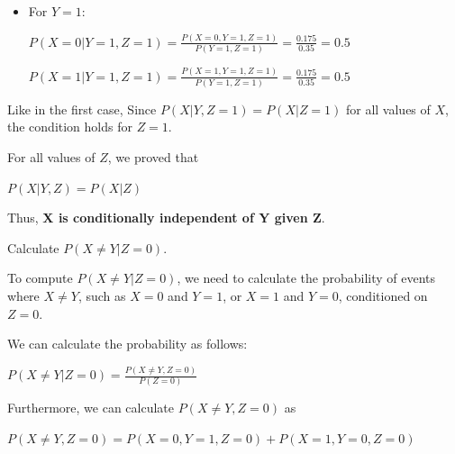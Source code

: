 \documentclass[12pt,letterpaper, onecolumn]{exam}
\begin{document}
\begin{questions}
\begin{parts}
\begin{subparts}
\begin{solution}
\begin{itemize}
\begin{center}
                    $\displaystyle{P(X=1|Y=0, Z=1) = \frac{P(X=1, Y=0, Z=1)}{P(Y=0, Z=1)} = \frac{0.1}{0.2} = 0.5}$
                    \end{center}

                    \item For $Y=1$:
                    \begin{center}
                    $\displaystyle{P(X=0|Y=1, Z=1) = \frac{P(X=0, Y=1, Z=1)}{P(Y=1, Z=1)} = \frac{0.175}{0.35} = 0.5}$

                    $\displaystyle{P(X=1|Y=1, Z=1) = \frac{P(X=1, Y=1, Z=1)}{P(Y=1, Z=1)} = \frac{0.175}{0.35} = 0.5}$
                    \end{center}
                \end{itemize}

                Like in the first case, Since $P(X|Y, Z=1) = P(X|Z=1)$ for all values of $X$, the condition holds for $Z=1$.

                For all values of $Z$, we proved that 

                \begin{center}
                    $\displaystyle{P(X|Y,Z) = P(X|Z)}$
                \end{center}

                Thus, \textbf{X is conditionally independent of Y given Z}.

            \end{solution}

            \pagebreak

            \subpart[5]
            Calculate $P (X \neq Y |Z = 0)$.
    
            \begin{solution}

                To compute $P(X \neq Y | Z = 0)$, we need to calculate the probability of events where $X \neq Y$, 
                such as $X=0$ and $Y=1$, or $X=1$ and $Y=0$, conditioned on $Z = 0$.

                We can calculate the probability as follows:

                \begin{center}
                    $\displaystyle{P(X \neq Y | Z = 0) = \frac{P(X \neq Y, Z = 0)}{P(Z=0)}}$
                \end{center}

                Furthermore, we can calculate $P(X \neq Y, Z = 0)$ as

                \begin{center}
                    $\displaystyle{P(X \neq Y, Z = 0) = P(X=0, Y=1, Z=0) + P(X=1, Y=0, Z=0)}$
                \end{center}


\end{solution}
\end{subparts}
\end{parts}
\end{questions}
\end{document}
